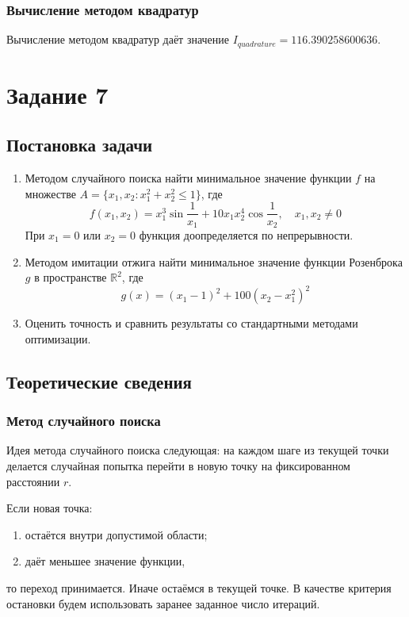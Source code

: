 \documentclass[11pt]{article}
\begin{document}
\subsubsection{Вычисление методом квадратур}
Вычисление методом квадратур даёт значение $I_{quadrature} = 116.390258600636$.

\section{Задание 7}
\subsection{Постановка задачи}
\begin{enumerate}
    \item Методом случайного поиска найти минимальное значение функции $f$ на множестве $ A = \{x_1, x_2 : x_1^2 + x_2^2 \leq 1\} $, где
$$
f(x_1, x_2) = x_1^3 \sin \frac{1}{x_1} + 10x_1x_2^4 \cos \frac{1}{x_2}, \quad x_1, x_2 \neq 0
$$
При $x_1 = 0$ или $x_2 = 0$ функция доопределяется по непрерывности.

    \item Методом имитации отжига найти минимальное значение функции Розенброка $g$ в пространстве $\mathbb{R}^2$, где
$$
g(x) = (x_1 - 1)^2 + 100(x_2 - x_1^2)^2
$$

    \item Оценить точность и сравнить результаты со стандартными методами оптимизации.
\end{enumerate}
\subsection{Теоретические сведения}
\subsubsection{Метод случайного поиска}
Идея метода случайного поиска следующая: на каждом шаге из текущей точки делается случайная попытка перейти в новую точку на фиксированном расстоянии $r$.

Если новая точка:
\begin{enumerate}
    \item остаётся внутри допустимой области;
    \item даёт меньшее значение функции,
\end{enumerate}
то переход принимается. Иначе остаёмся в текущей точке.
В качестве критерия остановки будем использовать заранее заданное число итераций.
\end{document}
